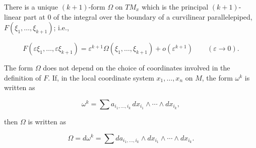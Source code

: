 There is a unique $(k+1)$-form $\Omega$ on $TM_x$ which is the principal $(k+1)$-linear part at $0$ of the integral over the boundary of a curvilinear parallelepiped, $F(\xi_1, \ldots, \xi_{k+1})$; i.e.,

$$
F(\varepsilon \xi_1, \ldots, \varepsilon \xi_{k+1}) = \varepsilon^{k+1} \Omega(\xi_1, \ldots, \xi_{k+1}) + o(\varepsilon^{k+1}) \qquad (\varepsilon \to 0).
$$

The form $\Omega$ does not depend on the choice of coordinates involved in the definition of $F$. If, in the local coordinate system $x_1, \ldots, x_n$ on $M$, the form $\omega^k$ is written as

$$
\omega^k = \sum a_{i_1, \ldots, i_k}\, dx_{i_1} \wedge \cdots \wedge dx_{i_k},
$$

then $\Omega$ is written as

$$
\Omega = d\omega^k = \sum da_{i_1, \ldots, i_k} \wedge dx_{i_1} \wedge \cdots \wedge dx_{i_k}.
$$
